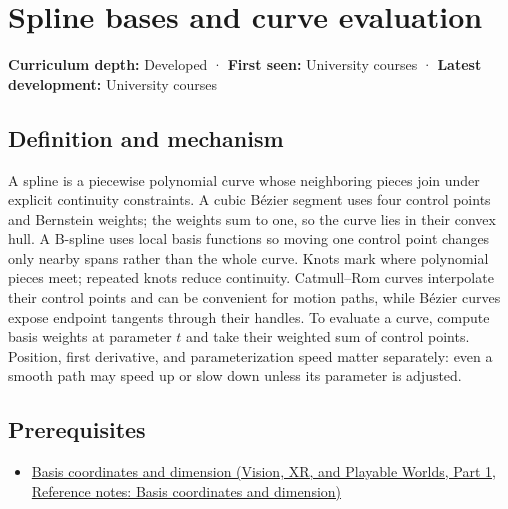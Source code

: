 \hypertarget{appendix-f28eeec97a3d}{}\label{referencestart:appendix-f28eeec97a3d}
\section{Spline bases and curve evaluation}\label{appendix-f28eeec97a3d-spline-bases-and-curve-evaluation}

\hypertarget{appendix-f28eeec97a3d-spline-bases-and-curve-evaluation}{}

\textbf{Curriculum depth:} Developed · \textbf{First seen:} University courses · \textbf{Latest development:} University courses

\begin{allmightroledefinition}

\subsection{Definition and mechanism}\label{appendix-f28eeec97a3d-definition-and-mechanism}

\hypertarget{appendix-f28eeec97a3d-definition-and-mechanism}{}

A spline is a piecewise polynomial curve whose neighboring pieces join under explicit continuity constraints. A cubic Bézier segment uses four control points and Bernstein weights; the weights sum to one, so the curve lies in their convex hull. A B-spline uses local basis functions so moving one control point changes only nearby spans rather than the whole curve. Knots mark where polynomial pieces meet; repeated knots reduce continuity. Catmull--Rom curves interpolate their control points and can be convenient for motion paths, while Bézier curves expose endpoint tangents through their handles. To evaluate a curve, compute basis weights at parameter \(t\) and take their weighted sum of control points. Position, first derivative, and parameterization speed matter separately: even a smooth path may speed up or slow down unless its parameter is adjusted.

\end{allmightroledefinition}

\subsection{Prerequisites}\label{appendix-f28eeec97a3d-prerequisites}

\hypertarget{appendix-f28eeec97a3d-prerequisites}{}

\begin{itemize}
\tightlist
\item
  \href{../07-Vision-XR-and-Playable-Worlds-P01/main.pdf\#appendix-ce0341f7ea0d}{Basis coordinates and dimension (Vision, XR, and Playable Worlds, Part 1, Reference notes: Basis coordinates and dimension)}
\end{itemize}

